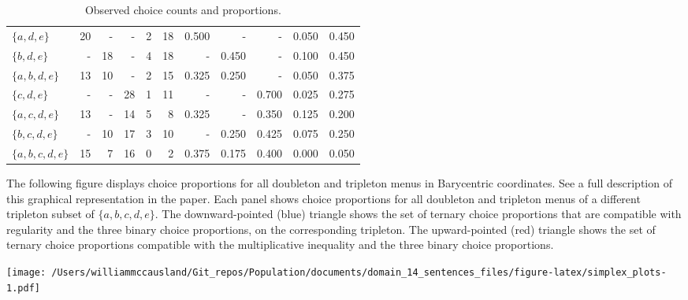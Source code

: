 \documentclass[
]{article}
\begin{document}
\begin{table}
\begin{tabular}{lrrrrrrrrrr}
$\{a,d,e\}$ & 20 & - & - & 2 & 18 & 0.500 & - & - & 0.050 & 0.450\\
\addlinespace
$\{b,d,e\}$ & - & 18 & - & 4 & 18 & - & 0.450 & - & 0.100 & 0.450\\
$\{a,b,d,e\}$ & 13 & 10 & - & 2 & 15 & 0.325 & 0.250 & - & 0.050 & 0.375\\
$\{c,d,e\}$ & - & - & 28 & 1 & 11 & - & - & 0.700 & 0.025 & 0.275\\
$\{a,c,d,e\}$ & 13 & - & 14 & 5 & 8 & 0.325 & - & 0.350 & 0.125 & 0.200\\
$\{b,c,d,e\}$ & - & 10 & 17 & 3 & 10 & - & 0.250 & 0.425 & 0.075 & 0.250\\
\addlinespace
$\{a,b,c,d,e\}$ & 15 & 7 & 16 & 0 & 2 & 0.375 & 0.175 & 0.400 & 0.000 & 0.050\\
\bottomrule
\end{tabular}
\caption{Observed choice counts and proportions.}
\label{t:count_prop}
\end{table}

The following figure displays choice proportions for all doubleton and
tripleton menus in Barycentric coordinates. See a full description of
this graphical representation in the paper. Each panel shows choice
proportions for all doubleton and tripleton menus of a different
tripleton subset of \(\{a,b,c,d,e\}\). The downward-pointed (blue)
triangle shows the set of ternary choice proportions that are compatible
with regularity and the three binary choice proportions, on the
corresponding tripleton. The upward-pointed (red) triangle shows the set
of ternary choice proportions compatible with the multiplicative
inequality and the three binary choice proportions.

\texttt{[image: /Users/williammccausland/Git\_repos/Population/documents/domain\_14\_sentences\_files/figure-latex/simplex\_plots-1.pdf]}
\end{document}
